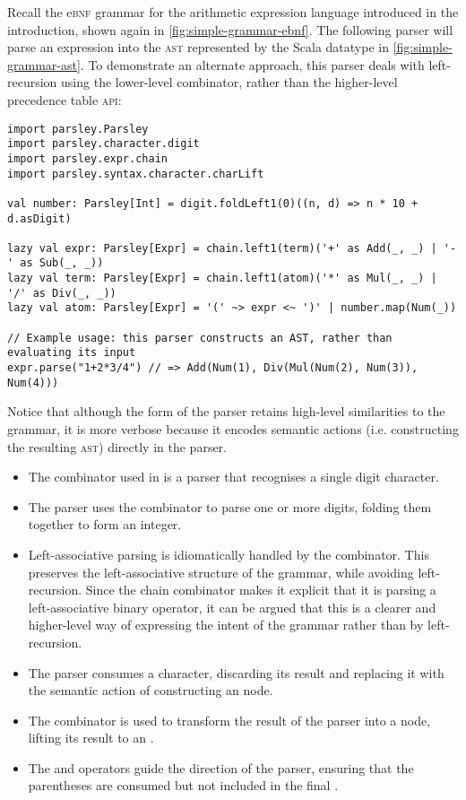 \documentclass[../../main.tex]{subfiles}
\begin{document}
\noindent %
Recall the e\textsc{bnf} grammar for the arithmetic expression language introduced in the introduction, shown again in \cref{fig:simple-grammar-ebnf}.
The following parser will parse an expression into the \textsc{ast} represented by the Scala datatype in \cref{fig:simple-grammar-ast}.
To demonstrate an alternate approach, this parser deals with left-recursion using the lower-level  combinator, rather than the higher-level precedence table \textsc{api}:
\begin{verbatim}
import parsley.Parsley
import parsley.character.digit
import parsley.expr.chain
import parsley.syntax.character.charLift

val number: Parsley[Int] = digit.foldLeft1(0)((n, d) => n * 10 + d.asDigit)

lazy val expr: Parsley[Expr] = chain.left1(term)('+' as Add(_, _) | '-' as Sub(_, _))
lazy val term: Parsley[Expr] = chain.left1(atom)('*' as Mul(_, _) | '/' as Div(_, _))
lazy val atom: Parsley[Expr] = '(' ~> expr <~ ')' | number.map(Num(_))

// Example usage: this parser constructs an AST, rather than evaluating its input
expr.parse("1+2*3/4") // => Add(Num(1), Div(Mul(Num(2), Num(3)), Num(4)))
\end{verbatim}
\vspace{1ex} %
%
Notice that although the form of the parser retains high-level similarities to the grammar, it is more verbose because it encodes semantic actions (i.e. constructing the resulting \textsc{ast}) directly in the parser.
\begin{itemize}
  \item The  combinator used in  is a parser that recognises a single digit character.
  \item The  parser uses the  combinator to parse one or more digits, folding them together to form an integer.
  \item Left-associative parsing is idiomatically handled by the  combinator. This preserves the left-associative structure of the grammar, while avoiding left-recursion. Since the chain combinator makes it explicit that it is parsing a left-associative binary operator, it can be argued that this is a clearer and higher-level way of expressing the intent of the grammar rather than by left-recursion.
  \item The  parser consumes a \scala{+} character, discarding its result and replacing it with the semantic action of constructing an  node.
  \item The  combinator is used to transform the result of the  parser into a  node, lifting its  result to an .
  \item The \scala{~>} and \scala{<~} operators guide the direction of the parser, ensuring that the parentheses are consumed but not included in the final .
\end{itemize}
\end{document}

